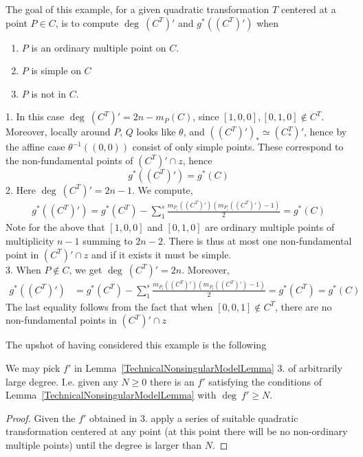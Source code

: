     \begin{example}
        The goal of this example, for a given quadratic transformation $T$ centered at a point $P\in C$, is to compute $\deg \ (C^T)'$ and $g^\ast((C^T)')$ when 
        \begin{enumerate}
            \item $P$ is an ordinary multiple point on $C$.
            \item $P$ is simple on $C$
            \item $P$ is not in $C$. 
        \end{enumerate}
        1. In this case $\deg \ (C^T)' = 2n-m_P(C)$, since $[1,0,0],[0,1,0]\notin C^T$. Moreover, locally around $P$, $Q$ looks like $\theta$, and $((C^T)')_\ast\simeq (C^T_\ast)'$, hence by the affine case $\theta^{-1}((0,0))$ consist of only simple points. These correspond to the non-fundamental points of $(C^T)'\cap z$, hence 
        $$
            g^\ast((C^T)') = g^\ast(C)
        $$  
        2. Here $\deg\ (C^T)' = 2n-1$. We compute,
        \begin{align*}
            g^\ast((C^T)') = g^\ast(C^T) - \sum_{1}^s \frac{m_{P_i}((C^T)')(m_{P_i}((C^T)')-1)}{2} = g^\ast(C)
        \end{align*}
        Note for the above that $[1,0,0]$ and $[0,1,0]$ are ordinary multiple points of multiplicity $n-1$ summing to $2n-2$. There is thus at most one non-fundamental point in $(C^T)'\cap z$ and if it exists it must be simple.\\  
        3. When $P\notin C$, we get $\deg \ (C^T)' = 2n$. Moreover, 
        \begin{align*}
            g^\ast((C^T)') &= g^\ast(C^T)-\sum_1^s \frac{m_{P_{i}}((C^T)')(m_{P_{i}}((C^T)')-1)}{2} = g^\ast(C^T)=g^\ast(C)
        \end{align*}  
        The last equality follows from the fact that when $[0,0,1]\notin C^T$, there are no non-fundamental points in $(C^T)'\cap z$
    \end{example}
    The upshot of having considered this example is the following 
    \begin{lemma}\label{TechnicalNonsingularModelLemmaCanBeChosenWithLargeDegree}
        We may pick $f'$ in Lemma~\ref{TechnicalNonsingularModelLemma} 3. of arbitrarily large degree. I.e. given any $N\geq 0$ there is an $f'$ satisfying the conditions of Lemma~\ref{TechnicalNonsingularModelLemma} with $\deg \ f'\geq N$. 
    \end{lemma}
    \begin{proof}
        Given the $f'$ obtained in 3. apply a series of suitable quadratic transformation centered at any point (at this point there will be no non-ordinary multiple points) until the degree is larger than $N$. 
    \end{proof}
